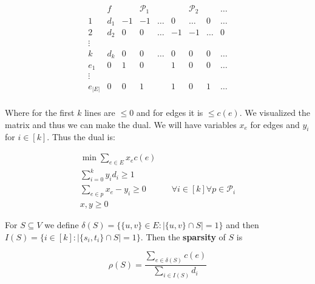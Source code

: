 $$
\begin{matrix}
	  & f     &    & \mathcal{P}_{1} &       &    & \mathcal{P}_{2} &       & \dots \\
	1 & d_{1} & -1 & -1              & \dots &  0 & \dots           & 0     & \dots \\
	2 & d_{2} & 0  &  0              & \dots & -1 & -1              & \dots & 0     \\
	\vdots  \\
	k & d_{k} & 0  &  0              & \dots & 0 & 0               &  0    & \dots \\
	e_{1} & 0     & 1  &  0              &       & 1 & 0               &  0    & \dots \\
	\vdots \\
	e_{|E|} & 0     & 0  &  1              &       & 1 & 0               &  1    & \dots \\
\end{matrix}
$$

Where for the first $k$ lines are $\leq 0$ and for edges it is $\leq c(e)$. We visualized the matrix and thus we can make the dual. We will have variables $x_{e}$ for edges and $y_{i}$ for $i \in [k]$. Thus the dual is:

$$
\begin{aligned}
	\min \sum_{e \in E} x_{e}c(e) \\
	\sum_{i = 0}^{k} y_{i}d_{i} \geq 1 \\
	\sum_{e \in p} x_{e} -y_{i} \geq 0 & \quad \forall i \in [k] \forall p \in \mathcal{P}_{i}\\
	x,y \geq 0
\end{aligned}
$$

\begin{defn}
	For $S \subseteq V$ we define $\delta(S) = \{\{u,v\} \in E : |\{u,v\} \cap S| = 1\}$ and then $I(S) = \{i \in [k] : |\{s_{i}, t_{i}\} \cap S| = 1\}$. Then the \textbf{sparsity} of $S$ is
	
	$$
	\rho(S) = \frac{\sum_{e \in \delta(S)}c(e)}{\sum_{i \in I(S)} d_{i}}
	$$
\end{defn}

